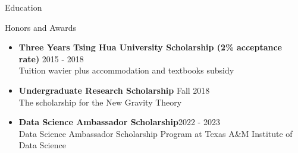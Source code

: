 \documentclass{resume}
\begin{document}
\begin{rSection}{Education}
\begin{rSection}{Honors and Awards}
    \begin{itemize}
        \item \textbf{Three Years Tsing Hua University Scholarship (2\% acceptance rate)} \hfill 2015 - 2018 \\
        Tuition wavier plus accommodation and textbooks subsidy
        \item \textbf{Undergraduate Research Scholarship} \hfill Fall 2018 \\
        The scholarship for the New Gravity Theory
        \item \textbf{Data Science Ambassador Scholarship}\hfill 2022 - 2023\\
        Data Science Ambassador Scholarship Program at Texas A\&M Institute of Data Science
    \end{itemize}
\end{rSection}
\end{rSection}









\end{document}
